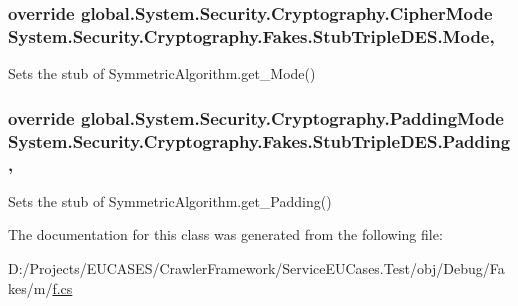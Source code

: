 \hypertarget{class_system_1_1_security_1_1_cryptography_1_1_fakes_1_1_stub_triple_d_e_s_ae0fffd2b130fae75b40c0e72524c13c3}{
\subsubsection[{Mode}]{\setlength{\rightskip}{0pt plus 5cm}override global.\-System.\-Security.\-Cryptography.\-Cipher\-Mode System.\-Security.\-Cryptography.\-Fakes.\-Stub\-Triple\-D\-E\-S.\-Mode\hspace{0.3cm}{\ttfamily [get]}, {\ttfamily [set]}}}\label{class_system_1_1_security_1_1_cryptography_1_1_fakes_1_1_stub_triple_d_e_s_ae0fffd2b130fae75b40c0e72524c13c3}


Sets the stub of Symmetric\-Algorithm.\-get\-\_\-\-Mode()

\hypertarget{class_system_1_1_security_1_1_cryptography_1_1_fakes_1_1_stub_triple_d_e_s_adee45d60407a85282f75d8164da1d5d6}{
\subsubsection[{Padding}]{\setlength{\rightskip}{0pt plus 5cm}override global.\-System.\-Security.\-Cryptography.\-Padding\-Mode System.\-Security.\-Cryptography.\-Fakes.\-Stub\-Triple\-D\-E\-S.\-Padding\hspace{0.3cm}{\ttfamily [get]}, {\ttfamily [set]}}}\label{class_system_1_1_security_1_1_cryptography_1_1_fakes_1_1_stub_triple_d_e_s_adee45d60407a85282f75d8164da1d5d6}


Sets the stub of Symmetric\-Algorithm.\-get\-\_\-\-Padding()



The documentation for this class was generated from the following file\-:\begin{DoxyCompactItemize}
\item 
D\-:/\-Projects/\-E\-U\-C\-A\-S\-E\-S/\-Crawler\-Framework/\-Service\-E\-U\-Cases.\-Test/obj/\-Debug/\-Fakes/m/\hyperlink{m_2f_8cs}{f.\-cs}\end{DoxyCompactItemize}
